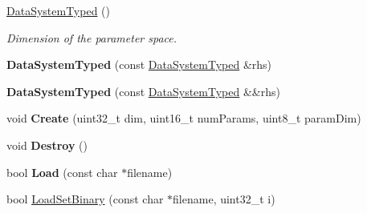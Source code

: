 \begin{DoxyCompactItemize}
\item 
\hypertarget{struct_d_r_d_s_p_1_1_data_system_typed_a5eb417702df126965b3371cd0fc6a8eb}{\hyperlink{struct_d_r_d_s_p_1_1_data_system_typed_a5eb417702df126965b3371cd0fc6a8eb}{Data\-System\-Typed} ()}\label{struct_d_r_d_s_p_1_1_data_system_typed_a5eb417702df126965b3371cd0fc6a8eb}

\begin{DoxyCompactList}\small\item\em Dimension of the parameter space. \end{DoxyCompactList}\item 
\hypertarget{struct_d_r_d_s_p_1_1_data_system_typed_aeca993ba97569b6cce26575df8fd71a2}{{\bfseries Data\-System\-Typed} (const \hyperlink{struct_d_r_d_s_p_1_1_data_system_typed}{Data\-System\-Typed} \&rhs)}\label{struct_d_r_d_s_p_1_1_data_system_typed_aeca993ba97569b6cce26575df8fd71a2}

\item 
\hypertarget{struct_d_r_d_s_p_1_1_data_system_typed_a36dcf2bd60c1e177507d1215ab8baf57}{{\bfseries Data\-System\-Typed} (const \hyperlink{struct_d_r_d_s_p_1_1_data_system_typed}{Data\-System\-Typed} \&\&rhs)}\label{struct_d_r_d_s_p_1_1_data_system_typed_a36dcf2bd60c1e177507d1215ab8baf57}

\item 
\hypertarget{struct_d_r_d_s_p_1_1_data_system_typed_acc04596b19fc88c69fcf404573e6dc3a}{void {\bfseries Create} (uint32\-\_\-t dim, uint16\-\_\-t num\-Params, uint8\-\_\-t param\-Dim)}\label{struct_d_r_d_s_p_1_1_data_system_typed_acc04596b19fc88c69fcf404573e6dc3a}

\item 
\hypertarget{struct_d_r_d_s_p_1_1_data_system_typed_a0ebf2395136854994f8dbc876b27ef16}{void {\bfseries Destroy} ()}\label{struct_d_r_d_s_p_1_1_data_system_typed_a0ebf2395136854994f8dbc876b27ef16}

\item 
\hypertarget{struct_d_r_d_s_p_1_1_data_system_typed_a98e789d6a53c5d8e0b78b53421d24164}{bool {\bfseries Load} (const char $\ast$filename)}\label{struct_d_r_d_s_p_1_1_data_system_typed_a98e789d6a53c5d8e0b78b53421d24164}

\item 
\hypertarget{struct_d_r_d_s_p_1_1_data_system_typed_a771a4fb04c009cab7a220aea627b68b3}{bool \hyperlink{struct_d_r_d_s_p_1_1_data_system_typed_a771a4fb04c009cab7a220aea627b68b3}{Load\-Set\-Binary} (const char $\ast$filename, uint32\-\_\-t i)}\label{struct_d_r_d_s_p_1_1_data_system_typed_a771a4fb04c009cab7a220aea627b68b3}


\end{DoxyCompactItemize}
